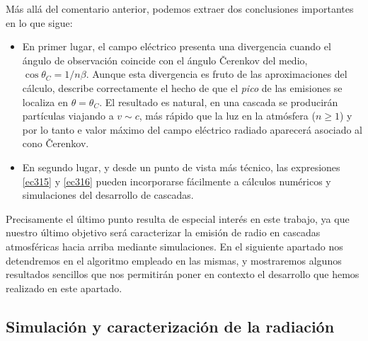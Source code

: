 \documentclass[12 pt, a4paper]{article} %
\numberwithin{equation}{section}
\numberwithin{figure}{section}
\numberwithin{table}{section}
\begin{document}
Más allá del comentario anterior, podemos extraer dos conclusiones importantes en lo que sigue:
\begin{itemize}
	\item En primer lugar, el campo eléctrico presenta una divergencia cuando el ángulo de observación coincide con el ángulo \v{C}erenkov del medio, $\cos{\theta_C}=1/n\beta$. Aunque esta divergencia es fruto de las aproximaciones del cálculo, describe correctamente el hecho de que el \textit{pico} de las emisiones se localiza en $\theta=\theta_C$. El resultado es natural, en una cascada se producirán partículas viajando a $v\sim c$, más rápido que la luz en la atmósfera ($n\geq 1$) y por lo tanto e valor máximo del campo eléctrico radiado aparecerá asociado al cono \v{C}erenkov.
	\item En segundo lugar, y desde un punto de vista más técnico, las expresiones \eqref{ec315} y \eqref{ec316} pueden incorporarse fácilmente a cálculos numéricos y simulaciones del desarrollo de cascadas.
\end{itemize}

Precisamente el último punto resulta de especial interés en este trabajo, ya que nuestro último objetivo será caracterizar la emisión de radio en cascadas atmosféricas hacia arriba mediante simulaciones. En el siguiente apartado nos detendremos en el algoritmo empleado en las mismas, y mostraremos algunos resultados sencillos que nos permitirán poner en contexto el desarrollo que hemos realizado en este apartado.

	\subsection{Simulación y caracterización de la radiación}\label{sec32}
\end{document}
